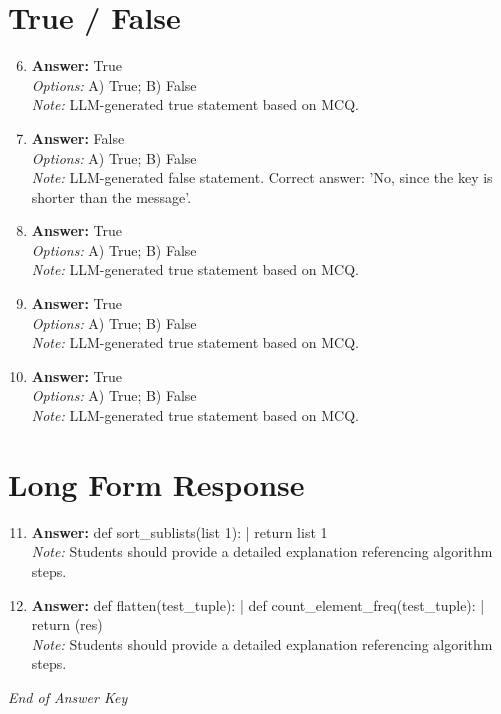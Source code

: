 \documentclass[12pt]{article}
\begin{document}
\section*{True / False}
\begin{enumerate}[label=\arabic*.]
\setcounter{enumi}{5}
\item \textbf{Answer:} True
\\ \textit{Options:} A) True; B) False
\\ \textit{Note:} LLM-generated true statement based on MCQ.
\item \textbf{Answer:} False
\\ \textit{Options:} A) True; B) False
\\ \textit{Note:} LLM-generated false statement. Correct answer: 'No, since the key is shorter than the message'.
\item \textbf{Answer:} True
\\ \textit{Options:} A) True; B) False
\\ \textit{Note:} LLM-generated true statement based on MCQ.
\item \textbf{Answer:} True
\\ \textit{Options:} A) True; B) False
\\ \textit{Note:} LLM-generated true statement based on MCQ.
\item \textbf{Answer:} True
\\ \textit{Options:} A) True; B) False
\\ \textit{Note:} LLM-generated true statement based on MCQ.
\end{enumerate}

\section*{Long Form Response}
\begin{enumerate}[label=\arabic*.]
\setcounter{enumi}{10}
\item \textbf{Answer:} def sort\_sublists(list 1): | return list 1
\\ \textit{Note:} Students should provide a detailed explanation referencing algorithm steps.
\item \textbf{Answer:} def flatten(test\_tuple): | def count\_element\_freq(test\_tuple): | return (res)
\\ \textit{Note:} Students should provide a detailed explanation referencing algorithm steps.
\end{enumerate}

\vfill
\noindent\textit{End of Answer Key}
\end{document}
